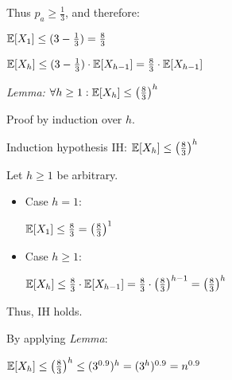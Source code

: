 Thus $p_a \geq \frac{1}{3}$, and therefore:

$\mathbb{E}[X_1] \leq
(3 - \frac{1}{3}) = \frac{8}{3}$

$\mathbb{E}[X_h] \leq 
(3 - \frac{1}{3}) \cdot \mathbb{E}[X_{h-1}] = 
\frac{8}{3} \cdot \mathbb{E}[X_{h-1}]$

\textit{Lemma:}
$\forall h \geq 1: \mathbb{E}[X_h] \leq \left(\frac{8}{3}\right)^h$

Proof by induction over $h$.

Induction hypothesis IH: $\mathbb{E}[X_h] \leq \left(\frac{8}{3}\right)^h$

Let $h \geq 1$ be arbitrary.

\begin{itemize}
    \item Case $h = 1$:
    
    $\mathbb{E}[X_1] \leq \frac{8}{3} = \left(\frac{8}{3}\right)^1$
    
    \item Case $h \geq 1$:
    
    $\mathbb{E}[X_h] \leq 
    \frac{8}{3} \cdot \mathbb{E}[X_{h-1}] = 
    \frac{8}{3} \cdot \left(\frac{8}{3}\right)^{h-1} = 
    \left(\frac{8}{3}\right)^h$
    
\end{itemize}

Thus, IH holds.

By applying \textit{Lemma}:

$\mathbb{E}[X_h] \leq 
\left(\frac{8}{3}\right)^h \leq
(3^{0.9})^h =
(3^h)^{0.9} = 
n^{0.9}$